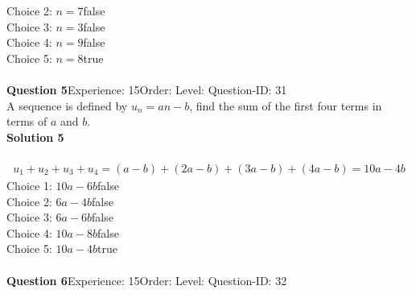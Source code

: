\documentclass{article}
\begin{document}
Choice 2: \hspace{20pt}$n=7$\hspace{20pt}false\\
Choice 3: \hspace{20pt}$n=3$\hspace{20pt}false\\
Choice 4: \hspace{20pt}$n=9$\hspace{20pt}false\\
Choice 5: \hspace{20pt}$n=8$\hspace{20pt}true\\
\\[4pt]
\noindent\textbf{Question 5}\hspace{20pt}Experience: 15\hspace{20pt}Order: \hspace{20pt}Level: \hspace{20pt}Question-ID: 31\\[2pt]
A sequence is defined by $u_n=an-b$, find the sum of the first four terms in terms of $a$ and $b$.\\[4pt]
\noindent\textbf{Solution 5}\\[2pt]
\\[-35pt]\begin{align*}
u_1+u_2+u_3+u_4=(a-b)+(2a-b)+(3a-b)+(4a-b)=10a-4b
\end{align*}
Choice 1: \hspace{20pt}$10a-6b$\hspace{20pt}false\\
Choice 2: \hspace{20pt}$6a-4b$\hspace{20pt}false\\
Choice 3: \hspace{20pt}$6a-6b$\hspace{20pt}false\\
Choice 4: \hspace{20pt}$10a-8b$\hspace{20pt}false\\
Choice 5: \hspace{20pt}$10a-4b$\hspace{20pt}true\\
\\[4pt]
\noindent\textbf{Question 6}\hspace{20pt}Experience: 15\hspace{20pt}Order: \hspace{20pt}Level: \hspace{20pt}Question-ID: 32\\[2pt]
\end{document}
